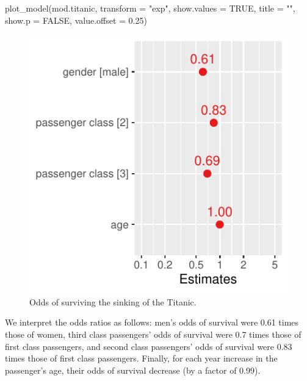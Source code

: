 \documentclass[
  letterpaper,
  DIV=11,
  numbers=noendperiod]{scrartcl}
\newenvironment{Shaded}{\begin{snugshade}}{\end{snugshade}}
\newcommand{\AttributeTok}[1]{\textcolor[rgb]{0.40,0.45,0.13}{#1}}
\newcommand{\ConstantTok}[1]{\textcolor[rgb]{0.56,0.35,0.01}{#1}}
\newcommand{\FloatTok}[1]{\textcolor[rgb]{0.68,0.00,0.00}{#1}}
\newcommand{\FunctionTok}[1]{\textcolor[rgb]{0.28,0.35,0.67}{#1}}
\newcommand{\NormalTok}[1]{\textcolor[rgb]{0.00,0.23,0.31}{#1}}
\newcommand{\StringTok}[1]{\textcolor[rgb]{0.13,0.47,0.30}{#1}}
\begin{document}
\begin{tcolorbox}
\begin{Shaded}
\begin{Highlighting}[]
\FunctionTok{plot\_model}\NormalTok{(mod.titanic,}
           \AttributeTok{transform =} \StringTok{"exp"}\NormalTok{,}
           \AttributeTok{show.values =} \ConstantTok{TRUE}\NormalTok{,}
           \AttributeTok{title =} \StringTok{""}\NormalTok{,}
           \AttributeTok{show.p =} \ConstantTok{FALSE}\NormalTok{, }
           \AttributeTok{value.offset =} \FloatTok{0.25}\NormalTok{)}
\end{Highlighting}
\end{Shaded}

\begin{figure}[H]

{\centering \includegraphics{about_files/figure-pdf/unnamed-chunk-16-1.pdf}

}

\caption{Odds of surviving the sinking of the Titanic.}

\end{figure}%

We interpret the odds ratios as follows: men's odds of survival were
0.61 times those of women, third class passengers' odds of survival were
0.7 times those of first class passengers, and second class passengers'
odds of survival were 0.83 times those of first class passengers.
Finally, for each year increase in the passenger's age, their odds of
survival decrease (by a factor of 0.99).

\end{tcolorbox}
\end{document}

